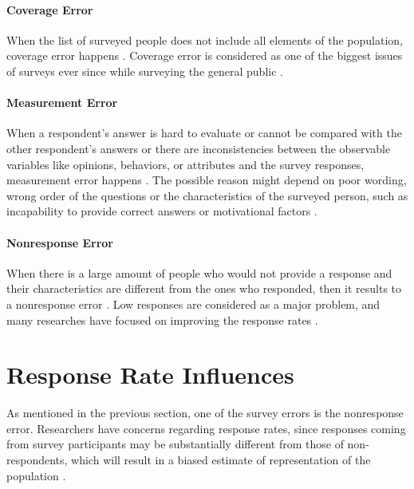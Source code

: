 \paragraph{Coverage Error}
When the list of surveyed people does not include all elements of the population, coverage error happens \citep[page 9]{Dillman2006}. Coverage error is considered as one of the biggest issues of surveys ever since while surveying the general public \citep{Dillman1991}.

\paragraph{Measurement Error}
When a respondent's answer is hard to evaluate or cannot be compared with the other respondent's answers or there are inconsistencies between the observable variables like opinions, behaviors, or attributes and the survey responses, measurement error happens \citetext{\citealp[page 9]{Dillman2006}; \citealp{Dillman1991}}. The possible reason might depend on poor wording, wrong order of the questions or the characteristics of the surveyed person, such as incapability to provide correct answers or motivational factors \citep{Dillman1991}.

\paragraph{Nonresponse Error}
When there is a large amount of people who would not provide a response and their characteristics are different from the ones who responded, then it results to a nonresponse error \citep[page 9]{Dillman2006}. Low responses are considered as a major problem, and many researches have focused on improving the response rates \citep{Dillman1991}.

\section{Response Rate Influences}
\label{sec:2.2:ResRatInf}

As mentioned in the previous section, one of the survey errors is the nonresponse error. Researchers have concerns regarding response rates, since responses coming from survey participants may be substantially different from those of non-respondents, which will result in a biased estimate of representation of the population \citep{Bogen1996}.
\vspace{1cm}

